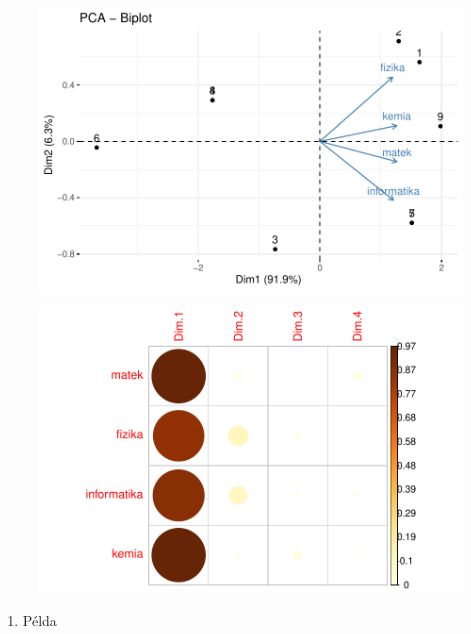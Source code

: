\documentclass[
  letterpaper,
]{krantz}
\providecommand{\tightlist}{%
  \setlength{\itemsep}{0pt}\setlength{\parskip}{0pt}}\usepackage{longtable,booktabs,array}
\begin{document}
\begin{figure}[H]

{\centering \includegraphics{./sec_fokomponens_elemzes_files/figure-pdf/unnamed-chunk-7-4.pdf}

}

\end{figure}

\begin{figure}[H]

{\centering \includegraphics{./sec_fokomponens_elemzes_files/figure-pdf/unnamed-chunk-7-5.pdf}

}

\end{figure}

\begin{enumerate}
\def\labelenumi{\arabic{enumi}.}
\setcounter{enumi}{1}
\tightlist
\item
  Példa
\end{enumerate}
\end{document}
